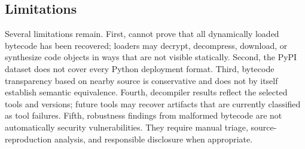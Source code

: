 \subsection{Limitations}

Several limitations remain.  First, {\tech} cannot prove that all dynamically loaded bytecode has been recovered; loaders may decrypt, decompress, download, or synthesize code objects in ways that are not visible statically.  Second, the PyPI dataset does not cover every Python deployment format.  Third, bytecode transparency based on nearby source is conservative and does not by itself establish semantic equivalence.  Fourth, decompiler results reflect the selected tools and versions; future tools may recover artifacts that are currently classified as tool failures.  Fifth, robustness findings from malformed bytecode are not automatically security vulnerabilities.  They require manual triage, source-reproduction analysis, and responsible disclosure when appropriate.
